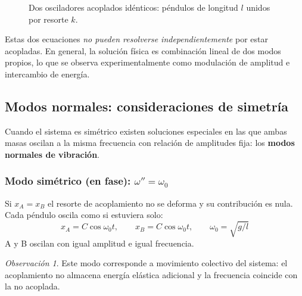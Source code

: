 \documentclass[12pt, a4paper]{article}
\theoremstyle{plain}
\theoremstyle{definition}
\theoremstyle{remark}
\newtheorem*{observacion}{Observación}
\begin{document}
\begin{figure}[H]
  \centering
  \caption{Dos osciladores acoplados idénticos: péndulos de longitud $l$ unidos por resorte $k$.}
\end{figure}

Estas dos ecuaciones \emph{no pueden resolverse independientemente} por estar acopladas.
En general, la solución física es combinación lineal de dos modos propios, lo que se
observa experimentalmente como modulación de amplitud e intercambio de energía.

\subsection{Modos normales: consideraciones de simetría}

Cuando el sistema es simétrico existen soluciones especiales en las que ambas masas
oscilan a la misma frecuencia con relación de amplitudes fija: los
\textbf{modos normales de vibración}.

\subsubsection{Modo simétrico (en fase): \texorpdfstring{$\omega'' = \omega_0$}{}}

Si $x_A = x_B$ el resorte de acoplamiento no se deforma y su contribución es nula. Cada
péndulo oscila como si estuviera solo:
\begin{equation}
  x_A = C\cos\omega_0 t,\qquad x_B = C\cos\omega_0 t,\qquad \omega_0 = \sqrt{g/l}
\end{equation}
A y B oscilan con igual amplitud e igual frecuencia.
\begin{observacion}
Este modo corresponde a movimiento colectivo del sistema: el acoplamiento no almacena
energía elástica adicional y la frecuencia coincide con la no acoplada.
\end{observacion}
\end{document}
